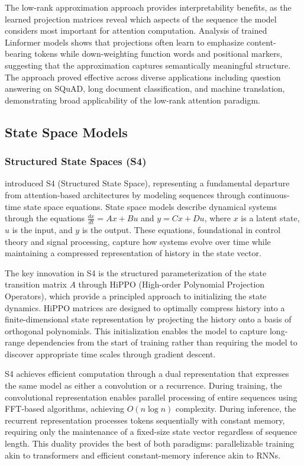 The low-rank approximation approach provides interpretability benefits, as the learned projection matrices reveal which aspects of the sequence the model considers most important for attention computation. Analysis of trained Linformer models shows that projections often learn to emphasize content-bearing tokens while down-weighting function words and positional markers, suggesting that the approximation captures semantically meaningful structure. The approach proved effective across diverse applications including question answering on SQuAD, long document classification, and machine translation, demonstrating broad applicability of the low-rank attention paradigm.

\subsection{State Space Models}

\subsubsection{Structured State Spaces (S4)}

\citet{gu2022efficiently} introduced S4 (Structured State Space), representing a fundamental departure from attention-based architectures by modeling sequences through continuous-time state space equations. State space models describe dynamical systems through the equations $\frac{dx}{dt} = Ax + Bu$ and $y = Cx + Du$, where $x$ is a latent state, $u$ is the input, and $y$ is the output. These equations, foundational in control theory and signal processing, capture how systems evolve over time while maintaining a compressed representation of history in the state vector.

The key innovation in S4 is the structured parameterization of the state transition matrix $A$ through HiPPO (High-order Polynomial Projection Operators), which provide a principled approach to initializing the state dynamics. HiPPO matrices are designed to optimally compress history into a finite-dimensional state representation by projecting the history onto a basis of orthogonal polynomials. This initialization enables the model to capture long-range dependencies from the start of training rather than requiring the model to discover appropriate time scales through gradient descent.

S4 achieves efficient computation through a dual representation that expresses the same model as either a convolution or a recurrence. During training, the convolutional representation enables parallel processing of entire sequences using FFT-based algorithms, achieving $O(n \log n)$ complexity. During inference, the recurrent representation processes tokens sequentially with constant memory, requiring only the maintenance of a fixed-size state vector regardless of sequence length. This duality provides the best of both paradigms: parallelizable training akin to transformers and efficient constant-memory inference akin to RNNs.

